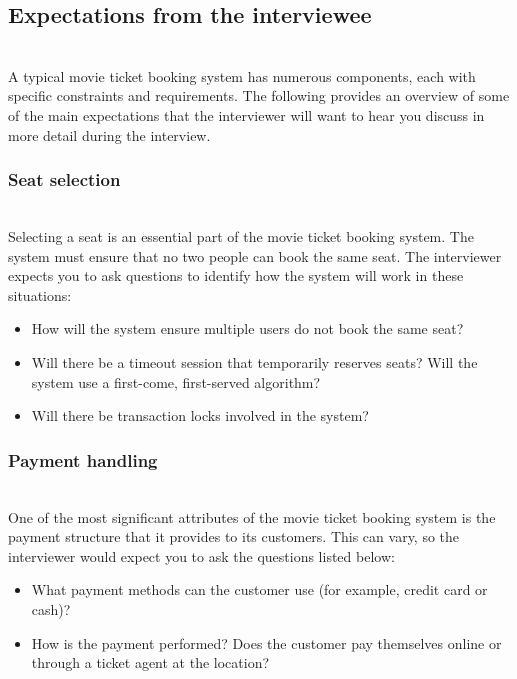 \subsection{Expectations from the interviewee}\label{DFpOXaHfjUJHQ4h6AROJx-2}
\\
A typical movie ticket booking system has numerous components, each with specific constraints and requirements. The following provides an overview of some of the main expectations that the interviewer will want to hear you discuss in more detail during the interview.

\subsubsection{Seat selection}\label{_e7rrB2ktLOwGTozRzsdM}
\\
Selecting a seat is an essential part of the movie ticket booking system. The system must ensure that no two people can book the same seat. The interviewer expects you to ask questions to identify how the system will work in these situations:

\begin{itemize}
\item
How will the system ensure multiple users do not book the same seat?
\item
Will there be a timeout session that temporarily reserves seats? Will the system use a first-come, first-served algorithm?
\item
Will there be transaction locks involved in the system?
\end{itemize}

\subsubsection{Payment handling}\label{eyHWHAHbyNYL3itm831JZ}
\\
One of the most significant attributes of the movie ticket booking system is the payment structure that it provides to its customers. This can vary, so the interviewer would expect you to ask the questions listed below:

\begin{itemize}
\item
\protect{}\label{WXru6qH9_qOo-vAqjjIcj}
What payment methods can the customer use (for example, credit card or cash)?
\item
\protect{}\label{gwf7hvnrKSzXhVIq0iiIS}
How is the payment performed? Does the customer pay themselves online or through a ticket agent at the location?
\end{itemize}

